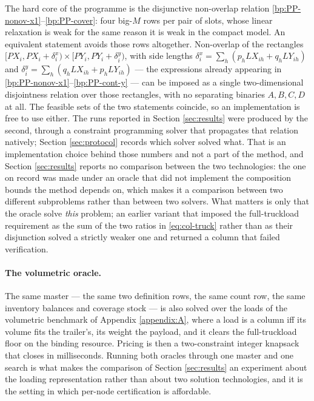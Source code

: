 The hard core of the programme is the disjunctive non-overlap relation
\eqref{bp:PP-nonov-x1}--\eqref{bp:PP-cover}: four big-$M$ rows per pair
of slots, whose linear relaxation is weak for the same reason it is weak
in the compact model. An equivalent statement avoids those rows
altogether. Non-overlap of the rectangles
$[\mathit{PX}_{i},\mathit{PX}_{i}+\delta^{x}_{i})\times
[\mathit{PY}_{i},\mathit{PY}_{i}+\delta^{y}_{i})$, with side lengths
$\delta^{x}_{i}=\sum_{h}(p_{h}\mathit{LX}_{ih}+q_{h}\mathit{LY}_{ih})$ and
$\delta^{y}_{i}=\sum_{h}(q_{h}\mathit{LX}_{ih}+p_{h}\mathit{LY}_{ih})$ ---
the expressions already appearing in
\eqref{bp:PP-nonov-x1}--\eqref{bp:PP-cont-y} --- can be imposed as a
single two-dimensional disjointness relation over those rectangles,
with no separating binaries $A,B,C,D$ at all. The feasible sets of the
two statements coincide, so an implementation is free to use either.
The runs reported in Section \ref{sec:results} were produced by the
second, through a constraint programming solver that propagates that
relation natively; Section \ref{sec:protocol} records which solver
solved what. That is an implementation choice behind those numbers and
not a part of the method, and Section \ref{sec:results} reports no
comparison between the two technologies: the one on record was made
under an oracle that did not implement the composition bounds the
method depends on, which makes it a comparison between two different
subproblems rather than between two solvers. What matters is only that
the oracle solve \emph{this} problem; an earlier variant that imposed
the full-truckload requirement as the sum of the two ratios in
\eqref{eq:col-truck} rather than as their disjunction solved a strictly
weaker one and returned a column that failed verification.

\paragraph{The volumetric oracle.}
The same master --- the same two definition rows, the same count row,
the same inventory balances and coverage stock --- is also solved over
the loads of the volumetric benchmark of Appendix \ref{appendix:A},
where a load is a column iff its volume fits the trailer's, its weight
the payload, and it clears the full-truckload floor on the binding
resource. Pricing is then a two-constraint integer knapsack that closes
in milliseconds. Running both oracles through one master and one search
is what makes the comparison of Section \ref{sec:results} an experiment
about the loading representation rather than about two solution
technologies, and it is the setting in which per-node certification is
affordable.

